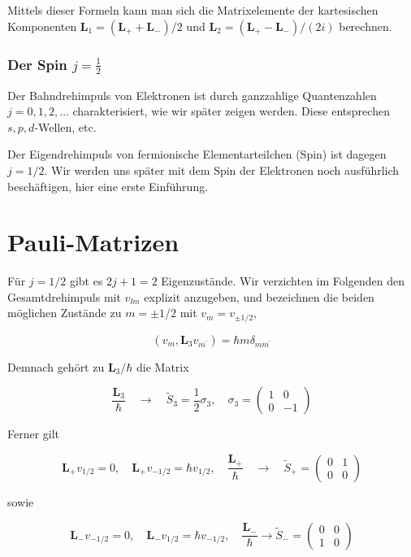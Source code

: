 \documentclass[10pt, letterpaper]{article}
\begin{document}
Mittels dieser Formeln kann man sich die Matrixelemente der kartesischen Komponenten $\mathbf{L}_{1}=\left(\mathbf{L}_{+}+\mathbf{L}_{-}\right) / 2$ und $\mathbf{L}_{2}=\left(\mathbf{L}_{+}-\mathbf{L}_{-}\right) /(2 i)$ berechnen.

\subsubsection*{Der Spin $j=\frac{1}{2}$}
Der Bahndrehimpuls von Elektronen ist durch ganzzahlige Quantenzahlen $j=0,1,2, \ldots$ charakterisiert, wie wir später zeigen werden. Diese entsprechen $s, p, d$-Wellen, etc.

Der Eigendrehimpuls von fermionische Elementarteilchen (Spin) ist dagegen $j=1 / 2$. Wir werden uns später mit dem Spin der Elektronen noch ausführlich beschäftigen, hier eine erste Einführung.

\section*{Pauli-Matrizen}
Für $j=1 / 2$ gibt es $2 j+1=2$ Eigenzustände. Wir verzichten im Folgenden den Gesamtdrehimpuls mit $v_{l m}$ explizit anzugeben, und bezeichnen die beiden möglichen Zustände zu $m= \pm 1 / 2$ mit $v_{m}=v_{ \pm 1 / 2}$,

$$
\left(v_{m}, \mathbf{L}_{3} v_{m^{\prime}}\right)=\hbar m \delta_{m m^{\prime}}
$$

Demnach gehört zu $\mathbf{L}_{3} / \hbar$ die Matrix

$$
\frac{\mathbf{L}_{3}}{\hbar} \quad \rightarrow \quad \tilde{S}_{3}=\frac{1}{2} \sigma_{3}, \quad \sigma_{3}=\left(\begin{array}{cc}
1 & 0 \\
0 & -1
\end{array}\right)
$$

Ferner gilt

$$
\mathbf{L}_{+} v_{1 / 2}=0, \quad \mathbf{L}_{+} v_{-1 / 2}=\hbar v_{1 / 2}, \quad \frac{\mathbf{L}_{+}}{\hbar} \quad \rightarrow \quad \tilde{S}_{+}=\left(\begin{array}{cc}
0 & 1 \\
0 & 0
\end{array}\right)
$$

sowie

$$
\mathbf{L}_{-} v_{-1 / 2}=0, \quad \mathbf{L}_{-} v_{1 / 2}=\hbar v_{-1 / 2}, \quad \frac{\mathbf{L}_{-}}{\hbar} \rightarrow \tilde{S}_{-}=\left(\begin{array}{cc}
0 & 0 \\
1 & 0
\end{array}\right)
$$
\end{document}
